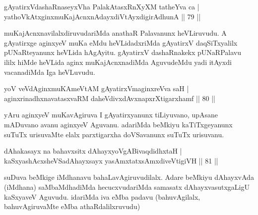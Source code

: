 \begin{shl}
gAyatirxVdashaRnaseyxVha PalakAtasxRnXyXM tatheYva ca | \\
yathoVkAtxginxmuKajAcnxnAdayxdiVtAyxdigirA\s dhunA \hfill||  79 || 
\end{shl}

\begin{artha} 
muKajAcnxnavilalxdiruvudariMda anathaR Palavanunx heVLiruvudu. A 
gAyatirxge aginxyeV muKa eMdu heVLidadxriMda gAyatirxV daqSiTxyalilx 
pUNaRteyanunx heVLida hAgAyitu. gAyatirxV dashaRnakekx pUNaRPalavu 
ililx hiMde heVLida aginx muKajAcnxnadiMda AguvudeMdu yadi itAyxdi 
vacanadiMda Iga heVLuvudu.
\end{artha}


\begin{shl}
yoV veVdAginxmuKAmeVtAM gAyatirxVmaginxreVva saH | \\
aginxrinadhxnavatasxvaRM daheVdivxdAvxnapxrXtigarxhamf \hfill||  80 || 
\end{shl}

\begin{artha} 
yAru aginxyeV muKavAgiruva I gAyatirxyanunx tiLiyuvano, upAsane 
mADuvano avanu aginxyeV Aguvanu. adariMda beMkiyu kaTiTxgeyanunx 
suTuTx urisuvaMte elalx parxtigarxha doVSavanunx suTuTx urisuvanu.
\end{artha}


\begin{shl}
dAhakasayx na bahavxsitx dAhayxyoVgABivaqdidhxtaH | \\
kaSxyashAcxsheVSadAhayxsayx yasAmxtatxsAmxdiveVtigiVH \hfill||  81 || 
\end{shl}

\begin{artha} 
suDuva beMkige iMdhanavu bahaLavAgiruvudilalx. Adare beMkiyu 
dAhayxvAda (iMdhana) saMbaMdhadiMda hecucxvudariMda samasatx 
dAhayxvasutxgaLigU kaSxyaveV Aguvudu. idariMda iva eMba padavu 
(bahuvAgilalx, bahuvAgiruvaMte eMba athaRdalilxruvudu)
\end{artha}


